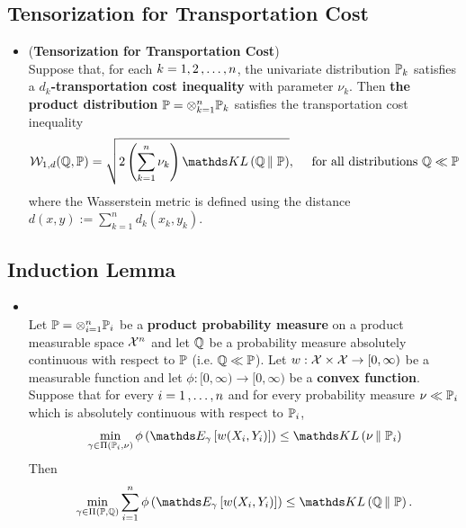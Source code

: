 \documentclass[11pt]{article}
\begin{document}
\subsection{Tensorization for Transportation Cost}
\begin{itemize}
\item \begin{proposition} (\textbf{Tensorization for Transportation Cost}) \citep{boucheron2013concentration}\\
Suppose that, for each $k = 1, 2 \,{,}\ldots{,}\, n$, the univariate distribution ${\mathbb P}_k$ satisfies a \textbf{$d_k$-transportation cost inequality} with parameter $\nu_k$. Then \textbf{the product distribution} ${\mathbb P} = \otimes_{k=1}^n {\mathbb P}_k$ satisfies the transportation cost inequality
\begin{align}
\cW_{1, d}(\bQ, \bP) &= \sqrt{2\paren{\sum_{k=1}^n \nu_k} \kl{\bQ}{\bP}}, \quad \text{ for all distributions $\bQ \ll \bP$ } \label{ineqn: tensorization_transport_cost}
\end{align}  where the Wasserstein metric is defined using the distance $d(x, y) :=  \sum_{k=1}^{n}d_k(x_k, y_k)$.
\end{proposition}
\end{itemize}

\subsection{Induction Lemma}
\begin{itemize}
\item \begin{lemma} \citep{boucheron2013concentration}\\
Let ${\mathbb P} = \otimes_{i=1}^{n}{\mathbb P}_i$ be a \textbf{product probability measure} on a product measurable space ${\mathcal X}^n$ and let ${\mathbb Q}$ be a probability measure absolutely continuous with respect to ${\mathbb P}$ (i.e. ${\mathbb Q} \ll {\mathbb P}$). Let $w : {\mathcal X} \times {\mathcal X} \to [0, \infty)$ be a measurable function and let $\phi : [0, \infty) \to [0, \infty)$ be a \textbf{convex function}. Suppose that for every $i = 1 \,{,}\ldots{,}\, n$ and for every probability measure $\nu \ll {\mathbb P}_i$ which is absolutely continuous with respect to ${\mathbb P}_i$,
\begin{align*}
\min_{\gamma \in \Pi( \bP_i, \nu)}\phi\paren{\E{\gamma}{w(X_i, Y_i)}} \le \kl{\nu}{\bP_i}
\end{align*} Then
\begin{align*}
\min_{\gamma \in \Pi( \bP, \bQ)} \sum_{i=1}^{n}\phi\paren{\E{\gamma}{w(X_i, Y_i)}} \le \kl{\bQ}{\bP}.
\end{align*}
\end{lemma}
\end{itemize}
\end{document}
